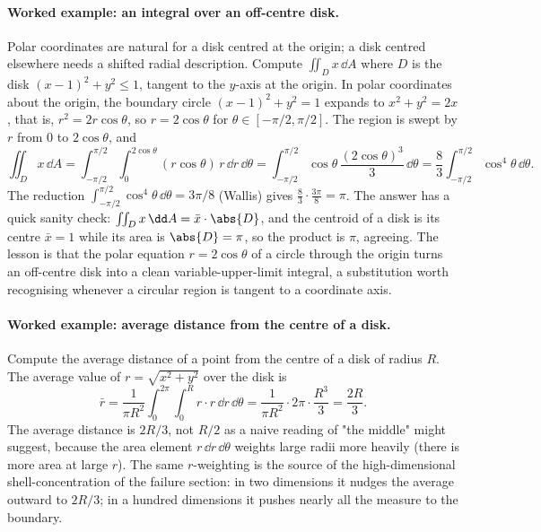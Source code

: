 \paragraph{Worked example: an integral over an off-centre disk.} Polar
coordinates are natural for a disk centred at the origin; a disk centred
elsewhere needs a shifted radial description. Compute $\iint_{D} x\,\dd A$
where $D$ is the disk $(x - 1)^{2} + y^{2} \leq 1$, tangent to the
$y$-axis at the origin. In polar coordinates about the origin, the
boundary circle $(x - 1)^{2} + y^{2} = 1$ expands to $x^{2} + y^{2} =
2x$, that is, $r^{2} = 2 r\cos\theta$, so $r = 2\cos\theta$ for
$\theta \in [-\pi/2, \pi/2]$. The region is swept by $r$ from $0$ to
$2\cos\theta$, and
\[
\iint_{D} x\,\dd A = \int_{-\pi/2}^{\pi/2}\!\int_{0}^{2\cos\theta}
(r\cos\theta)\,r\,\dd r\,\dd\theta
= \int_{-\pi/2}^{\pi/2}\cos\theta\,\frac{(2\cos\theta)^{3}}{3}\,
\dd\theta
= \frac{8}{3}\int_{-\pi/2}^{\pi/2}\cos^{4}\theta\,\dd\theta.
\]
The reduction $\int_{-\pi/2}^{\pi/2}\cos^{4}\theta\,\dd\theta = 3\pi/8$
(Wallis) gives $\tfrac{8}{3}\cdot\tfrac{3\pi}{8} = \pi$. The answer has a
quick sanity check: $\iint_{D} x\,\dd A = \bar{x}\cdot\abs{D}$, and the
centroid of a disk is its centre $\bar{x} = 1$ while its area is
$\abs{D} = \pi$, so the product is $\pi$, agreeing. The lesson is that
the polar equation $r = 2\cos\theta$ of a circle through the origin turns
an off-centre disk into a clean variable-upper-limit integral, a
substitution worth recognising whenever a circular region is tangent to
a coordinate axis.

\paragraph{Worked example: average distance from the centre of a
disk.} Compute the average distance of a point from the centre of a
disk of radius $R$. The average value of $r = \sqrt{x^{2} + y^{2}}$
over the disk is
\[
\bar{r} = \frac{1}{\pi R^{2}}\int_{0}^{2\pi}\!\int_{0}^{R}
r\cdot r\,\dd r\,\dd\theta
= \frac{1}{\pi R^{2}}\cdot 2\pi\cdot\frac{R^{3}}{3}
= \frac{2R}{3}.
\]
The average distance is $2R/3$, not $R/2$ as a naive reading of "the
middle" might suggest, because the area element $r\,\dd r\,\dd\theta$
weights large radii more heavily (there is more area at large $r$).
The same $r$-weighting is the source of the high-dimensional
shell-concentration of the failure section: in two dimensions it
nudges the average outward to $2R/3$; in a hundred dimensions it
pushes nearly all the measure to the boundary.

